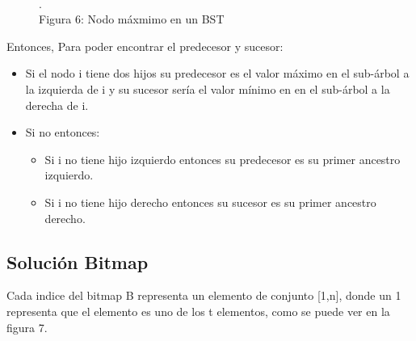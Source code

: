 \documentclass[11pt]{article}
\begin{document}
\begin{figure}[htp]
\begin{minipage}{.4\textwidth}
\\\scriptsize{\color{white}.\color{black}\\Figura 6: Nodo máxmimo en un BST}
\label{etiqueta}
\end{minipage}
\end{figure}

Entonces, Para poder encontrar el predecesor y sucesor:
\begin{itemize}
\item Si el nodo i tiene dos hijos su predecesor es el valor máximo en el sub-árbol a la izquierda de i y su sucesor sería el valor mínimo en en el sub-árbol a la derecha de i.
\item Si no entonces:
\begin{itemize}
\item Si i no tiene hijo izquierdo entonces su predecesor es su primer ancestro izquierdo.
\item Si i no tiene hijo derecho entonces su sucesor es su primer ancestro derecho.
\end{itemize}
\end{itemize}
\subsection{Solución Bitmap}
Cada indice del bitmap B representa un elemento de conjunto [1,n], donde un 1 representa que el elemento es uno de los t elementos, como se puede ver en la figura 7.\\
\end{document}
